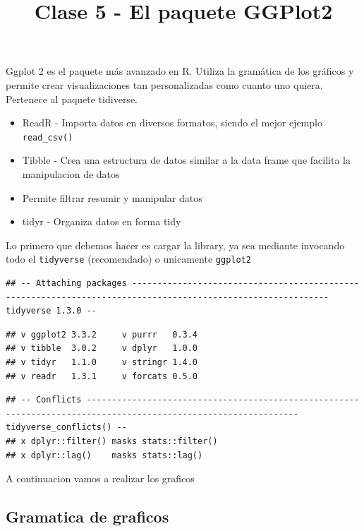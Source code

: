 \documentclass[
]{article}
\title{Clase 5 - El paquete GGPlot2}
\author{}
\date{\vspace{-2.5em}}
\providecommand{\tightlist}{%
  \setlength{\itemsep}{0pt}\setlength{\parskip}{0pt}}
\begin{document}
\maketitle

Ggplot 2 es el paquete más avanzado en R. Utiliza la gramática de los
gráficos y permite crear visualizaciones tan personalizadas como cuanto
uno quiera. Pertenece al paquete tidiverse.

\begin{itemize}
\tightlist
\item
  ReadR - Importa datos en diversos formatos, siendo el mejor ejemplo
  \texttt{read\_csv()}
\item
  Tibble - Crea una estructura de datos similar a la data frame que
  facilita la manipulacion de datos
\item
  Permite filtrar resumir y manipular datos
\item
  tidyr - Organiza datos en forma tidy
\end{itemize}

Lo primero que debemos hacer es cargar la library, ya sea mediante
invocando todo el \texttt{tidyverse} (recomendado) o unicamente
\texttt{ggplot2}

\begin{verbatim}
## -- Attaching packages ------------------------------------------------------------------------------------------------------------- tidyverse 1.3.0 --
\end{verbatim}

\begin{verbatim}
## v ggplot2 3.3.2     v purrr   0.3.4
## v tibble  3.0.2     v dplyr   1.0.0
## v tidyr   1.1.0     v stringr 1.4.0
## v readr   1.3.1     v forcats 0.5.0
\end{verbatim}

\begin{verbatim}
## -- Conflicts ---------------------------------------------------------------------------------------------------------------- tidyverse_conflicts() --
## x dplyr::filter() masks stats::filter()
## x dplyr::lag()    masks stats::lag()
\end{verbatim}

A continuacion vamos a realizar los graficos

\hypertarget{gramatica-de-graficos}{%
\subsection{Gramatica de graficos}\label{gramatica-de-graficos}}
\end{document}
